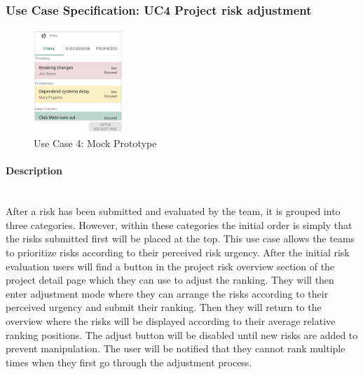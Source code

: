 \newpage
\subsubsection{Use Case Specification: \ac{UC}4 Project risk adjustment}
\label{sec:domainBbe}

\begin{figure}
	\includegraphics[width=0.3\textwidth]{Assets/UC_Screenshots/UC4S.png}
	\caption{Use Case 4: Mock Prototype}
	\label{fig:useCase4Detail}
\end{figure}

\paragraph*{Description}\mbox{}\\
After a risk has been submitted and evaluated by the team, it is grouped into three categories. However, within these categories the initial order is simply that the risks submitted first will be placed at the top. This use case allows the teams to prioritize risks according to their perceived risk urgency. After the initial risk evaluation users will find a button in the project risk overview section of the project detail page which they can use to adjust the ranking. They will then enter adjustment mode where they can arrange the risks according to their perceived urgency and submit their ranking. Then they will return to the overview where the risks will be displayed according to their average relative ranking positions. The adjust button will be disabled until new risks are added to prevent manipulation. The user will be notified that they cannot rank multiple times when they first go through the adjustment process. 

